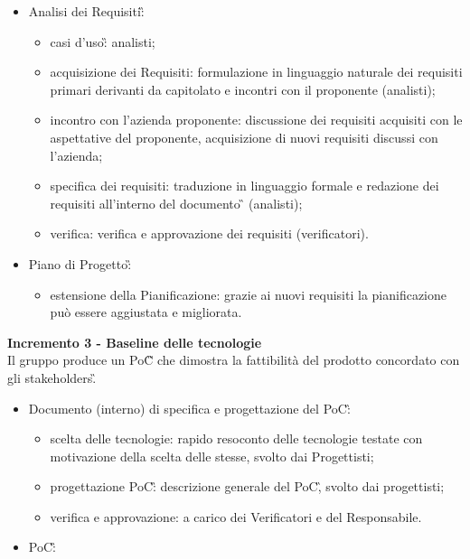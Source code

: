 {{    \begin{itemize}
        \item Analisi dei Requisiti\G:
            \begin{itemize}
                \item casi d'uso\G: analisti;
                \item acquisizione dei Requisiti: formulazione in linguaggio naturale dei requisiti primari derivanti da capitolato e incontri con il proponente (analisti);
                \item incontro con l'azienda proponente: discussione dei requisiti acquisiti con le aspettative del proponente, acquisizione di nuovi requisiti discussi con l'azienda;
                \item specifica dei requisiti: traduzione in linguaggio formale e redazione dei requisiti all'interno del documento \AdR\G{} (analisti);
                \item verifica: verifica e approvazione dei requisiti (verificatori).
            \end{itemize}
    \item Piano di Progetto\G: 
        \begin{itemize}
            \item estensione della Pianificazione: grazie ai nuovi requisiti la pianificazione può essere aggiustata e migliorata.
        \end{itemize} 
    \end{itemize}
    \textbf{Incremento 3 - Baseline delle tecnologie} \\
    Il gruppo produce un PoC\G{} che dimostra la fattibilità del prodotto concordato con gli stakeholders\G. \\
    \begin{itemize}
        \item Documento (interno) di specifica e progettazione del PoC\G:
            \begin{itemize}
                \item scelta delle tecnologie: rapido resoconto delle tecnologie testate con motivazione della scelta delle stesse, svolto dai Progettisti;
                \item progettazione PoC\G: descrizione generale del PoC\G, svolto dai progettisti;
                \item verifica e approvazione: a carico dei Verificatori e del Responsabile.
            \end{itemize}
        \item PoC\G: 

\end{itemize}}}
